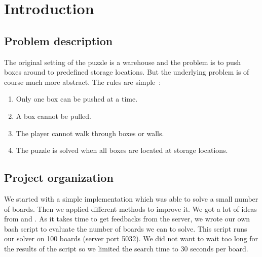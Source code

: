 \documentclass[a4paper,10pt]{article}
\begin{document}
\cleardoublepage
\tableofcontents
\newpage


\section{Introduction}
	\subsection{Problem description}
    The original setting of the puzzle is a warehouse and the problem is to push boxes
    around to predefined storage locations.  
    But the underlying problem is of course much more abstract.  The rules are simple~\cite{wiki_soko}: 
    \begin{enumerate}[I]
        \item  Only one box can be pushed at a time.
        \item A box cannot be pulled.
        \item The player cannot walk through boxes or walls.
        \item The puzzle is solved when all boxes are located at storage locations.
    \end{enumerate}
    
    \subsection{Project organization}
	We started with a simple implementation which was able to solve a small number of boards. 
	Then we applied different methods to improve it.  
        We got a lot of ideas from \cite{solving_soko} and \cite{wiki_soko}.
	As it takes time to get feedbacks from the server, we wrote our own bash script to evaluate the number of boards we can to solve.
	This script runs our solver on 100 boards (server port 5032).
	We did not want to wait too long for the results of the script so we limited the search time to 30 seconds per board.
\end{document}
